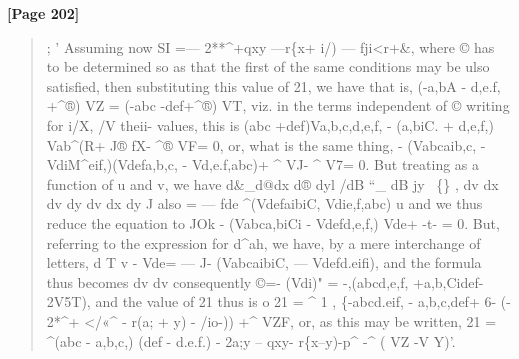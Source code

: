 \documentclass[11pt,a4paper]{book}
\begin{document}
\textbf{[Page 202]}\\[0.2cm]
\begin{quote}
; '
Assuming now
SI
=--- 2**\textasciicircum{}+qxy ---r\{x+
i/)
---
fji<r+\&,
where © has to be determined so as that the first of the same conditions may be
ulso satisfied, then substituting this value of 21, we have
that is,
(-a,bA - d,e.f, +\textasciicircum{}®) VZ = (-abc -def+\textasciicircum{}®) VT,
viz. in the terms independent of © writing for i/X, /V theii- values, this is
(abc +def)Va,b,c,d,e,f, - (a,biC. + d,e,f,) Vab\textasciicircum{}(R+ J® fX- \textasciicircum{}® VF= 0,
or, what is the same thing,
- (Vabcaib,c, - VdiM\textasciicircum{}eif,)(Vdefa,b,c, - Vd,e.f,abc)+ \textasciicircum{} VJ- \textasciicircum{} V7= 0.
But treating as a function of u and v, we have
d\&\_d@dx d® dyl /dB ``\_ dB jy
~\{\} ,
dv dx dv dy dv dx dy J
also
= ---
fde \textasciicircum{}(VdefaibiC, Vdie,f,abc)
u
and we thus reduce the equation to
JOk
- (Vabca,biCi - Vdefd,e,f,) Vde+ -t- = 0.
But, referring to the expression for d\textasciicircum{}ah, we have, by a mere interchange of letters,
d
T
v
-
Vde= ---
J- (VabcaibiC,
---
Vdefd.eifi),
and the formula thus becomes
dv dv
consequently
©=- (Vdi)" = -,(abcd,e,f, +a,b,Cidef-2V5T),
and the value of 21 thus is
o
21 = \textasciicircum{} 1 , \{-abcd.eif, - a,b,c,def+ 6- (- 2*\textasciicircum{}+ </«\textasciicircum{} - r(a; + y) - /io-)) +\textasciicircum{} VZF,
or, as this may be written,
21 = \textasciicircum{}(abc - a,b,c,) (def - d.e.f.) - 2a;y -- qxy- r\{x--y)-p\textasciicircum{} -\textasciicircum{} ( VZ -V Y)'.
\end{quote}
\end{document}
